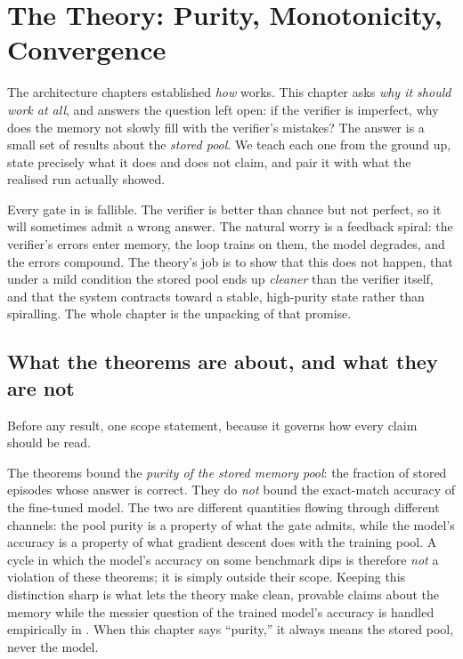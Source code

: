 \chapter{The Theory: Purity, Monotonicity, Convergence}
\label{ch:theory}

The architecture chapters established \emph{how} \caem{} works. This chapter asks
\emph{why it should work at all}, and answers the question  left open:
if the verifier is imperfect, why does the memory not slowly fill with the verifier's
mistakes? The answer is a small set of results about the \emph{stored pool}. We teach
each one from the ground up, state precisely what it does and does not claim, and pair
it with what the realised run actually showed.

\begin{intuition}
Every gate in \caem{} is fallible. The verifier is better than chance but not perfect,
so it will sometimes admit a wrong answer. The natural worry is a feedback spiral: the
verifier's errors enter memory, the loop trains on them, the model degrades, and the
errors compound. The theory's job is to show that this does not happen, that under a
mild condition the stored pool ends up \emph{cleaner} than the verifier itself, and that
the system contracts toward a stable, high-purity state rather than spiralling. The
whole chapter is the unpacking of that promise.
\end{intuition}

\section{What the theorems are about, and what they are not}
\label{sec:theory-scope}

Before any result, one scope statement, because it governs how every claim should be
read.

\begin{pitfall}
The theorems bound the \emph{purity of the stored memory pool}: the fraction of stored
episodes whose answer is correct. They do \emph{not} bound the exact-match accuracy of
the fine-tuned model. The two are different quantities flowing through different
channels: the pool purity is a property of what the gate admits, while the model's
accuracy is a property of what gradient descent does with the training pool. A cycle in
which the model's accuracy on some benchmark dips is therefore \emph{not} a violation of
these theorems; it is simply outside their scope. Keeping this distinction sharp is what
lets the theory make clean, provable claims about the memory while the messier question
of the trained model's accuracy is handled empirically in . When this
chapter says ``purity,'' it always means the stored pool, never the model.
\end{pitfall}

